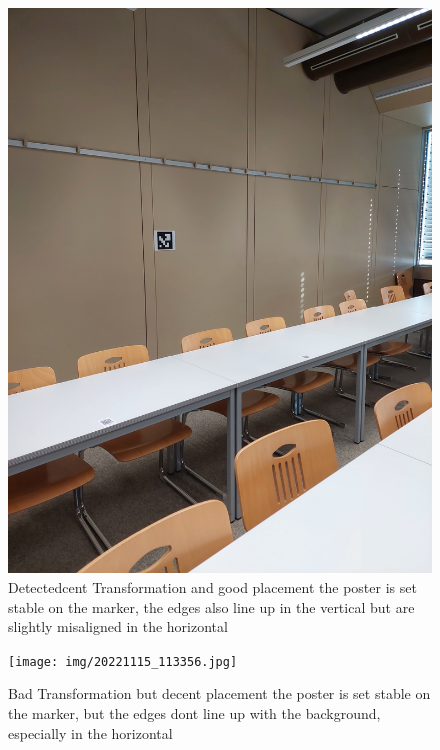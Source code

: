 \documentclass[a4paper,twocolumn]{article}
\begin{document}
    \begin{figure}[h!]
    \centering
    \includegraphics[width=0.9\columnwidth]{img/20221115_113346.jpg} %
    \caption{Detectedcent Transformation and good placement the poster is set stable on the marker, the edges also line up in the vertical but are slightly misaligned in the horizontal }
    \label{fig:20221115_113346.jpg}
    \end{figure}
    
    \begin{figure}[h!]
    \centering
    \texttt{[image: img/20221115\_113356.jpg]} %
    \caption{Bad Transformation but decent placement the poster is set stable on the marker, but the edges dont line up with the background, especially in the horizontal}
    \label{fig:20221115_113356.jpg}
    \end{figure}
    
\end{document}
